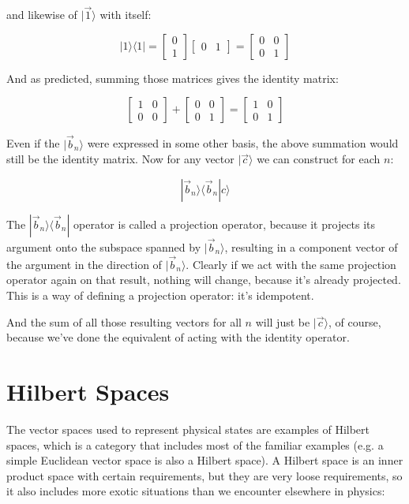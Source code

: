 and likewise of $|\vec{1} \rangle$ with itself:

$$
|1 \rangle \langle 1| = 
\begin{bmatrix} 0 \\ 1 \end{bmatrix}
\begin{bmatrix} 0 & 1 \end{bmatrix} =
\begin{bmatrix} 0 & 0 \\ 0 & 1 \end{bmatrix}
$$

And as predicted, summing those matrices gives the identity matrix:

$$
\begin{bmatrix} 1 & 0 \\ 0 & 0 \end{bmatrix} +
\begin{bmatrix} 0 & 0 \\ 0 & 1 \end{bmatrix} =
\begin{bmatrix} 1 & 0 \\ 0 & 1 \end{bmatrix}
$$

Even if the $|\vec{b}_n \rangle$ were expressed in some other basis, the above summation would still be the identity matrix. Now for any vector $|\vec{c} \rangle$ we can construct for each $n$:

$$|\vec{b}_n \rangle \langle \vec{b}_n | c \rangle$$

The $|\vec{b}_n \rangle \langle \vec{b}_n|$ operator is called a projection operator, because it projects its argument onto the subspace spanned by $|\vec{b}_n \rangle$, resulting in a component vector of the argument in the direction of $|\vec{b}_n \rangle$. Clearly if we act with the same projection operator again on that result, nothing will change, because it's already projected. This is a way of defining a projection operator: it's idempotent.

And the sum of all those resulting vectors for all $n$ will just be $|\vec{c} \rangle$, of course, because we've done the equivalent of acting with the identity operator.

\section{Hilbert Spaces}

The vector spaces used to represent physical states are examples of Hilbert spaces, which is a category that includes most of the familiar examples (e.g. a simple Euclidean vector space is also a Hilbert space). A Hilbert space is an inner product space with certain requirements, but they are very loose requirements, so it also includes more exotic situations than we encounter elsewhere in physics:

